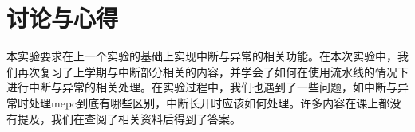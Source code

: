 \section{讨论与心得}
本实验要求在上一个实验的基础上实现中断与异常的相关功能。在本次实验中，我们再次复习了上学期与中断部分相关的内容，并学会了如何在使用流水线的情况下进行中断与异常的相关处理。在实验过程中，我们也遇到了一些问题，如中断与异常时处理mepc到底有哪些区别，中断长开时应该如何处理。许多内容在课上都没有提及，我们在查阅了相关资料后得到了答案。